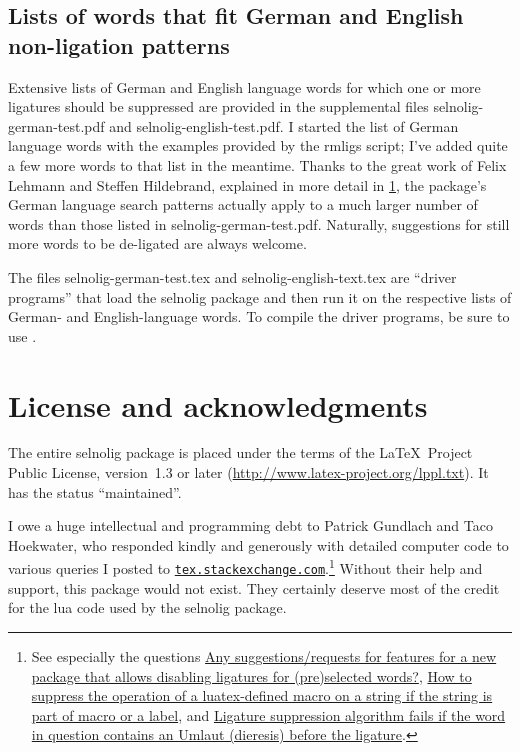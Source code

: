 \documentclass[11pt]{article}
\newcommand{\pkg}[1]{\textsf{#1}}
\begin{document}
\subsection{Lists of words that fit German and English non-ligation patterns}

Extensive lists of German and English language words for which one or more ligatures should be suppressed are provided in the supplemental files \pkg{selnolig-german-test.pdf} and \pkg{selnolig-english-test.pdf}. I started the list of German language words with the examples provided by the \pkg{rmligs} script; I've added quite a few more words to that list in the meantime. Thanks to the great work of Felix Lehmann and Steffen Hildebrand, explained in more detail in \cref{sec:thanks}, the package's German language search patterns actually apply to a much larger number of words than those listed in \pkg{selnolig-german-test.pdf}. Naturally, suggestions for still more words to be de-ligated are always welcome.

The files \pkg{selnolig-german-test.tex} and \pkg{selnolig-english-text.tex} are \enquote{driver programs} that load the \pkg{selnolig} package and then run it on the respective lists of German- and English-language words. To compile the driver programs, be sure to use \LuaLaTeX.

\section{License and acknowledgments} \label{sec:thanks}

The entire \pkg{selnolig} package is placed under the terms of the \LaTeX\ Project Public License, version~1.3 or later (\url{http://www.latex-project.org/lppl.txt}).
It has the status \enquote{maintained}.

I owe a huge intellectual and programming debt to Patrick Gundlach and Taco Hoekwater, who responded kindly and generously with detailed computer code to various queries I posted to \href{http://tex.stackexchange.com}{\texttt{tex.stackexchange.com}}.\footnote{See especially the questions \href{http://tex.stackexchange.com/q/37443/5001}{Any suggestions/requests for features for a new package that allows disabling ligatures for (pre)selected words?}, \href{http://tex.stackexchange.com/q/48516/5001}{How to suppress the operation of a luatex-defined macro on a string if the string is part of macro or a label}, and \href{http://tex.stackexchange.com/q/63005/5001}{Ligature suppression algorithm fails if the word in question contains an Umlaut (dieresis) before the ligature}.} Without their help and support, this package would not exist. They certainly deserve most of the credit for the lua code used by the \pkg{selnolig} package.
\end{document}
